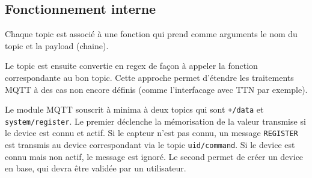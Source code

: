 %
%
%
%
%
%
%
%


\subsection{Fonctionnement interne}

Chaque topic est associé à une fonction qui prend comme arguments le nom du topic et la payload (chaine).

Le topic est ensuite convertie en regex de façon à appeler la fonction correspondante au bon topic. Cette approche permet d'étendre les traitements MQTT à des cas non encore définis (comme l'interfacage avec TTN par exemple).


Le module MQTT souscrit à minima à deux topics qui sont \lstinline|+/data| et \lstinline|system/register|. Le premier déclenche la mémorisation de la valeur transmise si le device est connu et actif. Si le capteur n'est pas connu, un message \lstinline|REGISTER| est transmis au device correspondant via le topic \lstinline|uid/command|. Si le device est connu mais non actif, le message est ignoré. Le second permet de créer un device en base, qui devra être validée par un utilisateur.


